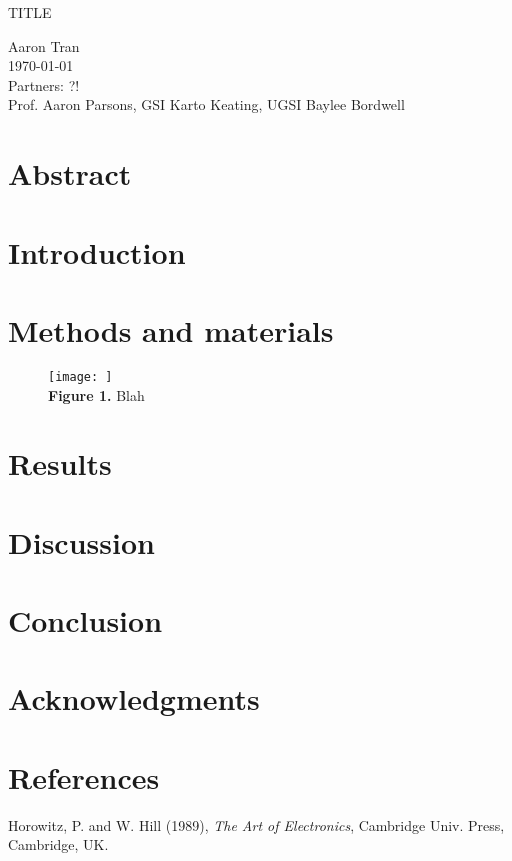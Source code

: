 \documentclass[11pt]{article}
\begin{document}
\begin{center}
\Large{TITLE}

\large
Aaron Tran \\
\today \\
Partners: ?! \\
Prof. Aaron Parsons, GSI Karto Keating, UGSI Baylee Bordwell
\end{center}

\section*{Abstract}

\section{Introduction}

\section{Methods and materials}

\begin{figure}[h]
    \centering
    \texttt{[image: ]} \\
    \textbf{Figure 1.} Blah
\end{figure}

\section{Results}

\section{Discussion}

\section{Conclusion}

\section{Acknowledgments}

\section{References}

\ngindent 0.25in Horowitz, P. and W. Hill (1989), \emph{The Art of
Electronics}, Cambridge Univ. Press, Cambridge, UK.
\end{document}
